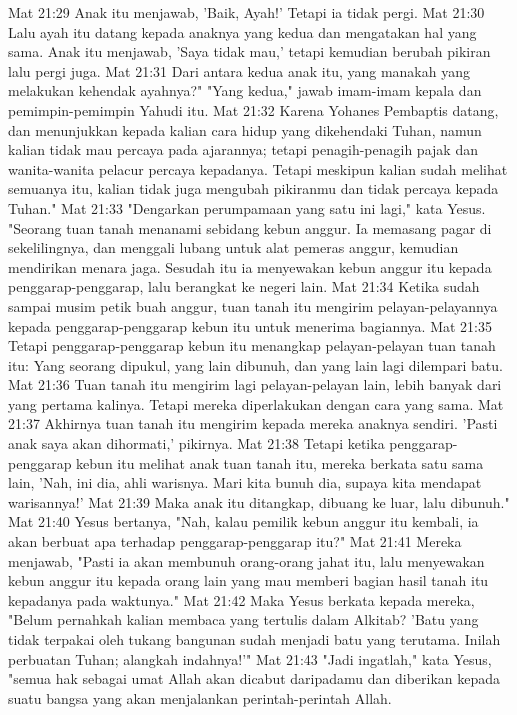 Mat 21:29  Anak itu menjawab, 'Baik, Ayah!' Tetapi ia tidak pergi.
Mat 21:30  Lalu ayah itu datang kepada anaknya yang kedua dan mengatakan hal yang sama. Anak itu menjawab, 'Saya tidak mau,' tetapi kemudian berubah pikiran lalu pergi juga.
Mat 21:31  Dari antara kedua anak itu, yang manakah yang melakukan kehendak ayahnya?" "Yang kedua," jawab imam-imam kepala dan pemimpin-pemimpin Yahudi itu.
Mat 21:32  Karena Yohanes Pembaptis datang, dan menunjukkan kepada kalian cara hidup yang dikehendaki Tuhan, namun kalian tidak mau percaya pada ajarannya; tetapi penagih-penagih pajak dan wanita-wanita pelacur percaya kepadanya. Tetapi meskipun kalian sudah melihat semuanya itu, kalian tidak juga mengubah pikiranmu dan tidak percaya kepada Tuhan."
Mat 21:33  "Dengarkan perumpamaan yang satu ini lagi," kata Yesus. "Seorang tuan tanah menanami sebidang kebun anggur. Ia memasang pagar di sekelilingnya, dan menggali lubang untuk alat pemeras anggur, kemudian mendirikan menara jaga. Sesudah itu ia menyewakan kebun anggur itu kepada penggarap-penggarap, lalu berangkat ke negeri lain.
Mat 21:34  Ketika sudah sampai musim petik buah anggur, tuan tanah itu mengirim pelayan-pelayannya kepada penggarap-penggarap kebun itu untuk menerima bagiannya.
Mat 21:35  Tetapi penggarap-penggarap kebun itu menangkap pelayan-pelayan tuan tanah itu: Yang seorang dipukul, yang lain dibunuh, dan yang lain lagi dilempari batu.
Mat 21:36  Tuan tanah itu mengirim lagi pelayan-pelayan lain, lebih banyak dari yang pertama kalinya. Tetapi mereka diperlakukan dengan cara yang sama.
Mat 21:37  Akhirnya tuan tanah itu mengirim kepada mereka anaknya sendiri. 'Pasti anak saya akan dihormati,' pikirnya.
Mat 21:38  Tetapi ketika penggarap-penggarap kebun itu melihat anak tuan tanah itu, mereka berkata satu sama lain, 'Nah, ini dia, ahli warisnya. Mari kita bunuh dia, supaya kita mendapat warisannya!'
Mat 21:39  Maka anak itu ditangkap, dibuang ke luar, lalu dibunuh."
Mat 21:40  Yesus bertanya, "Nah, kalau pemilik kebun anggur itu kembali, ia akan berbuat apa terhadap penggarap-penggarap itu?"
Mat 21:41  Mereka menjawab, "Pasti ia akan membunuh orang-orang jahat itu, lalu menyewakan kebun anggur itu kepada orang lain yang mau memberi bagian hasil tanah itu kepadanya pada waktunya."
Mat 21:42  Maka Yesus berkata kepada mereka, "Belum pernahkah kalian membaca yang tertulis dalam Alkitab? 'Batu yang tidak terpakai oleh tukang bangunan sudah menjadi batu yang terutama. Inilah perbuatan Tuhan; alangkah indahnya!'"
Mat 21:43  "Jadi ingatlah," kata Yesus, "semua hak sebagai umat Allah akan dicabut daripadamu dan diberikan kepada suatu bangsa yang akan menjalankan perintah-perintah Allah.
